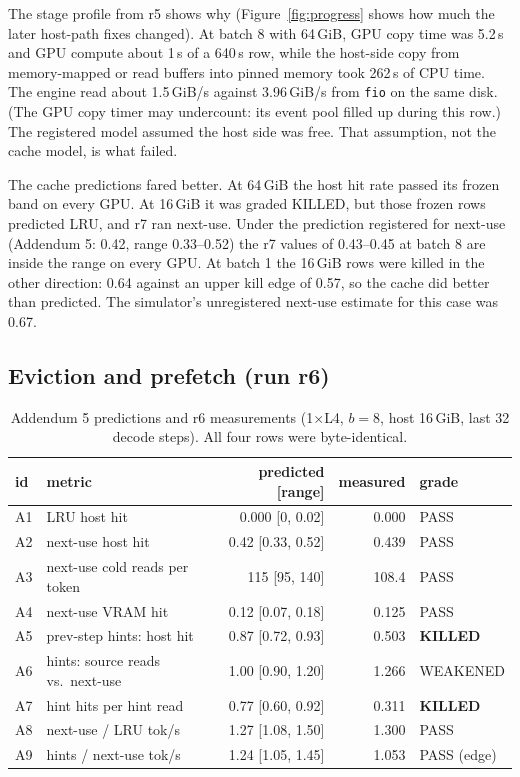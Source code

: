 \documentclass[11pt]{article}
\newcommand{\killed}{\textbf{KILLED}}
\begin{document}
The stage profile from r5 shows why (Figure~\ref{fig:progress} shows how much
the later host-path fixes changed). At batch 8 with 64\,GiB, GPU copy time was
5.2\,s and GPU compute about 1\,s of a 640\,s row, while the host-side copy from
memory-mapped or read buffers into pinned memory took 262\,s of CPU time. The
engine read about 1.5\,GiB/s against 3.96\,GiB/s from \texttt{fio} on the same
disk. (The GPU copy timer may undercount: its event pool filled up during
this row.) The registered model assumed the host side was free. That assumption,
not the cache model, is what failed.

The cache predictions fared better. At 64\,GiB the host hit rate passed its
frozen band on every GPU. At 16\,GiB it was graded KILLED, but those frozen
rows predicted LRU, and r7 ran next-use. Under the prediction registered for
next-use (Addendum 5: 0.42, range 0.33--0.52) the r7 values of 0.43--0.45 at
batch 8 are inside the range on every GPU. At batch 1 the 16\,GiB rows were killed in the
other direction: 0.64 against an upper kill edge of 0.57, so the cache did
better than predicted. The simulator's unregistered next-use estimate for this
case was 0.67.

\subsection{Eviction and prefetch (run r6)}\label{sec:policy}

\begin{table}[htbp]
\centering\small
\caption{Addendum 5 predictions and r6 measurements (1$\times$L4, $b=8$, host
16\,GiB, last 32 decode steps). All four rows were byte-identical.}
\label{tab:r6}
\begin{tabular}{llrrl}
\toprule
id & metric & predicted [range] & measured & grade \\
\midrule
A1 & LRU host hit & 0.000 [0, 0.02] & 0.000 & PASS \\
A2 & next-use host hit & 0.42 [0.33, 0.52] & 0.439 & PASS \\
A3 & next-use cold reads per token & 115 [95, 140] & 108.4 & PASS \\
A4 & next-use VRAM hit & 0.12 [0.07, 0.18] & 0.125 & PASS \\
A5 & prev-step hints: host hit & 0.87 [0.72, 0.93] & 0.503 & \killed \\
A6 & hints: source reads vs.\ next-use & 1.00 [0.90, 1.20] & 1.266 & WEAKENED \\
A7 & hint hits per hint read & 0.77 [0.60, 0.92] & 0.311 & \killed \\
A8 & next-use / LRU tok/s & 1.27 [1.08, 1.50] & 1.300 & PASS \\
A9 & hints / next-use tok/s & 1.24 [1.05, 1.45] & 1.053 & PASS (edge) \\
\bottomrule
\end{tabular}
\end{table}
\end{document}
